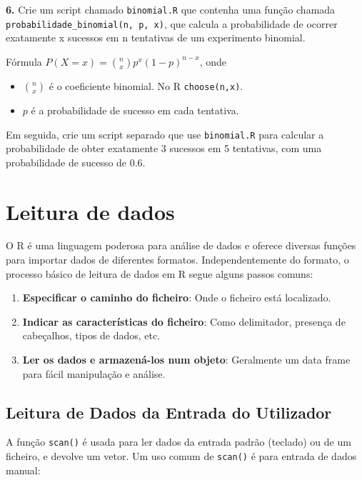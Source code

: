\documentclass[
]{book}
\providecommand{\tightlist}{%
  \setlength{\itemsep}{0pt}\setlength{\parskip}{0pt}}
\begin{document}
\textbf{6.} Crie um script chamado \texttt{binomial.R} que contenha uma função chamada \texttt{probabilidade\_binomial(n,\ p,\ x)}, que calcula a probabilidade de ocorrer exatamente x sucessos em n tentativas de um experimento binomial.

Fórmula \(P(X=x) = \binom{n}{x}p^x(1-p)^{n-x}\), onde

\begin{itemize}
\tightlist
\item
  \(\binom{n}{x}\) é o coeficiente binomial. No R \texttt{choose(n,x)}.
\item
  \(p\) é a probabilidade de sucesso em cada tentativa.
\end{itemize}

Em seguida, crie um script separado que use \texttt{binomial.R} para calcular a probabilidade de obter exatamente 3 sucessos em 5 tentativas, com uma probabilidade de sucesso de 0.6.

\chapter{Leitura de dados}\label{leitura-de-dados}

O R é uma linguagem poderosa para análise de dados e oferece diversas
funções para importar dados de diferentes formatos. Independentemente do
formato, o processo básico de leitura de dados em R segue alguns passos
comuns:

\begin{enumerate}
\def\labelenumi{\arabic{enumi}.}
\tightlist
\item
  \textbf{Especificar o caminho do ficheiro}: Onde o ficheiro está
  localizado.
\item
  \textbf{Indicar as características do ficheiro}: Como delimitador,
  presença de cabeçalhos, tipos de dados, etc.
\item
  \textbf{Ler os dados e armazená-los num objeto}: Geralmente um data frame
  para fácil manipulação e análise.
\end{enumerate}

\section{Leitura de Dados da Entrada do Utilizador}\label{leitura-de-dados-da-entrada-do-utilizador}

A função \texttt{scan()} é usada para ler dados da entrada padrão (teclado) ou
de um ficheiro, e devolve um vetor. Um uso comum de \texttt{scan()} é para
entrada de dados manual:
\end{document}
